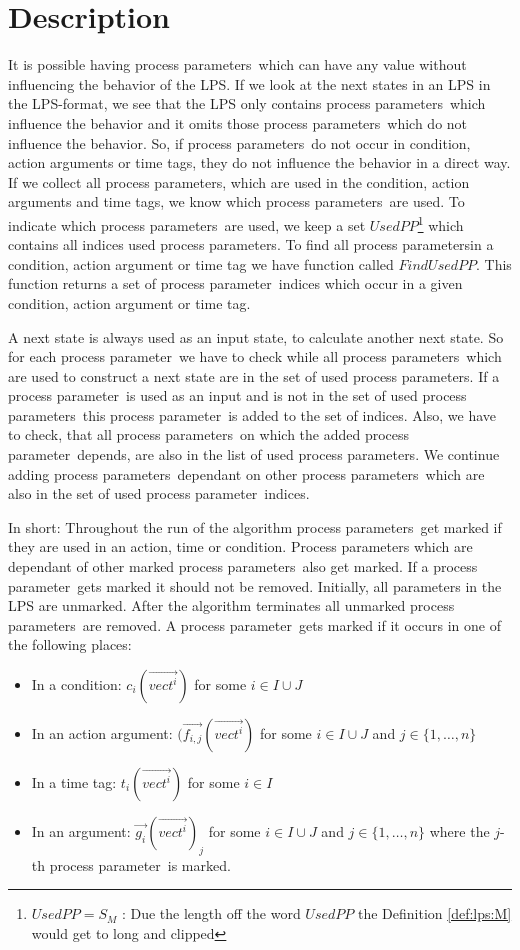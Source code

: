 \documentclass[a4paper,10pt]{article}
\theoremstyle{plain}
\theoremstyle{definition}
\newcommand{\ovr}{\overrightarrow}
\newcommand{\pp}{process parameter}
\newcommand{\pps}{process parameters}
\begin{document}
\section{Description} \label{sec:desc}
It is possible having \pps\ which can have any value without influencing the behavior of the LPS. 
If we look at the next states in an LPS in the LPS-format, we see that the LPS only contains \pps\ which influence the behavior and it omits those \pps\ which do not influence the behavior. So, if \pps\ do not occur in condition, action arguments or time tags, they do not influence the behavior in a direct way. If we collect all \pps , which are used in the condition, action arguments and time tags, we know which \pps\ are used. To indicate which \pps\ are used, we keep a set $UsedPP$\footnote{$UsedPP = S_M$ : Due the length off the word $UsedPP$ the Definition \ref{def:lps:M} would get to long and clipped} which contains all indices used \pps . To find all \pps in a condition, action argument or time tag we have function called $FindUsedPP$. This function returns a set of  \pp\ indices which occur in a given condition, action argument or time tag. 

A next state is always used as an input state, to calculate another next state. So for each \pp\ we have to check while  all \pps\ which are used to construct a next state are in the set of used \pps . If a \pp\ is used as an input and is not in the set of used \pps\ this \pp\ is added to the set of indices. 
Also, we have to check, that all \pps\ on which the added \pp\ depends, are also in the list of used \pps. We continue adding \pps\ dependant on other \pps\ which are also in the set of used \pp\ indices.

In short: Throughout the run of the algorithm \pps\ get marked if they are used in an action, time or condition. Process parameters which are dependant of other marked \pps\ also get marked. If a \pp\ gets marked it should not be removed. Initially, all parameters in the LPS are unmarked. After the algorithm terminates all unmarked \pps\ are removed. A \pp\ gets marked if it occurs in one of the following places:

\begin{itemize}
\item In a condition: $c_i(\ovr{vect^i})$ for some $i \in I \cup J$
\item In an action argument: %
$(\ovr{f_{i,j}}(\ovr{vect^i})$ for some $i \in I \cup J$ and $j \in \lbrace 1, \ldots , n \rbrace$
\item In a time tag: $t_i(\ovr{vect^i})$ for some $i \in I$
\item In an argument: $\ovr{g_i}(\ovr{vect^i})_j$ for some $i \in I \cup J$ and $j \in \lbrace 1, \ldots , n \rbrace $ where the $j$-th \pp\ is marked.
\end{itemize}
\end{document}
